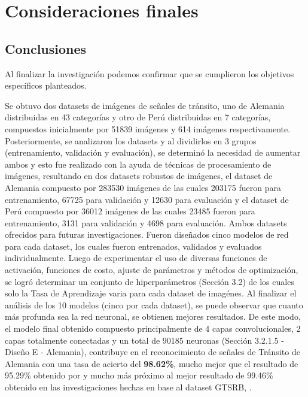 \chapter{Consideraciones finales}
\setcounter{page}{128}
\renewcommand{\baselinestretch}{2} %
\textheight 21cm

\section{Conclusiones}

	Al finalizar la investigación podemos confirmar que se cumplieron los objetivos específicos planteados.

	Se obtuvo dos datasets de imágenes de señales de tránsito, uno de Alemania distribuidas en 43 categorías y otro de Perú distribuidas en 7 categorías, compuestos inicialmente por 51839 imágenes y 614 imágenes respectivamente.
\vskip 0.2cm
	Posteriormente, se analizaron los datasets y al dividirlos en 3 grupos (entrenamiento, validación y evaluación), se determinó la necesidad de aumentar ambos y esto fue realizado con la ayuda de técnicas de procesamiento de imágenes, resultando en dos datasets robustos de imágenes, el dataset de Alemania compuesto por 283530 imágenes de las cuales 203175 fueron para entrenamiento, 67725 para validación y 12630 para evaluación y el dataset de Perú compuesto por 36012 imágenes de las cuales 23485 fueron para entrenamiento, 3131 para validación y 4698 para evaluación. Ambos datasets ofrecidos para futuras investigaciones.
\vskip 0.2cm
	Fueron diseñados cinco modelos de red para cada dataset, los cuales fueron entrenados, validados y evaluados individualmente.
\vskip 0.2cm
	Luego de experimentar el uso de diversas funciones de activación, funciones de costo, ajuste de parámetros y métodos de optimización, se logró determinar un conjunto de hiperparámetros (Sección 3.2) de los cuales solo la Tasa de Aprendizaje varia para cada dataset de imagénes. 
	\vskip 0.2cm
	Al finalizar el análisis de los 10 modelos (cinco por cada dataset), se puede observar que cuanto más profunda sea la red neuronal, se obtienen mejores resultados. 
\vskip 0.2cm
	De este modo, el modelo final obtenido compuesto principalmente de 4 capas convolucionales, 2 capas totalmente conectadas y un total de 90185 neuronas (Sección 3.2.1.5 - Diseño E - Alemania), contribuye en el reconocimiento de señales de Tránsito de Alemania con una tasa de acierto del {\bf 98.62\%}, mucho mejor que el resultado de 95.29\% obtenido por \citep{Ayuque2016} y mucho más próximo al mejor resultado de 99.46\% obtenido en las investigaciones hechas en base al dataset GTSRB, \citep{Ciresan}.
	\vskip 0.2cm
	
